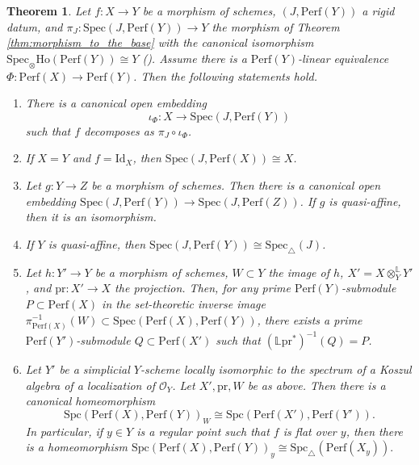 \documentclass[11pt]{amsart}
\theoremstyle{definition}
\theoremstyle{plain}
\newtheorem{thm}[defn]{Theorem}
\theoremstyle{remark}
\newcommand{\Ho}{\mathrm{Ho}}
\newcommand{\perf}{\mathrm{Perf}}
\newcommand{\Spec}{\mathrm{Spec}}
\newcommand{\tSpec}{\mathrm{Spec}_{\triangle}}
\newcommand{\mo}{\mathrm}
\newcommand{\sO}{\mathscr{O}}
\newcommand{\ld}{\mathbb{L}}
\newcommand{\dotimes}{\otimes^{\mathbb{L}}}
\newcommand{\Id}{\mathrm{Id}}
\newcommand{\oSpec}{\mathrm{Spec}_{\otimes}}
\newcommand{\Spc}{\mathrm{Spc}}
\newcommand{\tSpc}{\mathrm{Spc}_{\triangle}}
\numberwithin{equation}{section}
\begin{document}
\begin{thm}\label{thm:example_of_perfect_complexes}
Let \(f:X\to Y\) be a morphism of schemes, \((J,\perf(Y))\) a rigid datum, 
and \(\pi_J:\Spec(J,\perf(Y))\to Y\) the morphism of 
Theorem \ref{thm:morphism_to_the_base} with the canonical isomorphism 
\(\oSpec\Ho(\perf(Y))\cong Y\) (\cite{Ba}).  
Assume there is a \(\perf(Y)\)-linear equivalence 
\(\Phi:\perf(X)\to \perf(Y)\).  
Then the following statements hold.
\begin{enumerate}
  \item There is a canonical open embedding 
  \[\iota_{\Phi}:X\to \Spec(J,\perf(Y))\] 
  such that \(f\) decomposes as \(\pi_J\circ\iota_\Phi\).
  \item If \(X=Y\) and \(f=\Id_X\), then \(\Spec(J,\perf(X))\cong X\).
  \item Let \(g:Y\to Z\) be a morphism of schemes.  
  Then there is a canonical open embedding \(\Spec(J,\perf(Y))\to \Spec(J,\perf(Z))\).  
  If \(g\) is quasi-affine, then it is an isomorphism.
  \item If \(Y\) is quasi-affine, then \(\Spec(J,\perf(Y))\cong \tSpec(J)\).
  \item Let \(h:Y'\to Y\) be a morphism of schemes, \(W\subset Y\) the image of \(h\), \(X'=X\dotimes_Y Y'\), and \(\mo{pr}:X'\to X\) the projection.  
  Then, for any prime \(\perf(Y)\)-submodule \(P\subset \perf(X)\) in the set-theoretic inverse image \(\pi^{-1}_{\perf(X)}(W)\subset \Spec(\perf(X),\perf(Y))\), there exists a prime \(\perf(Y')\)-submodule \(Q\subset \perf(X')\) such that \((\ld \mo{pr}^*)^{-1}(Q)=P \).
  \item Let \(Y'\) be a simplicial \(Y\)-scheme locally isomorphic to the spectrum of a Koszul algebra of a localization of \(\sO_Y\).  
  Let \(X',\mo{pr},W\) be as above.  
  Then there is a canonical homeomorphism
  \[\Spc(\perf(X),\perf(Y))_{W}\cong \Spc(\perf(X'),\perf(Y')).\]  
  In particular, if \(y\in Y\) is a regular point such that \(f\) is flat over \(y\), then there is a homeomorphism \(\Spc(\perf(X),\perf(Y))_y\cong \tSpc(\perf(X_y)).\)
\end{enumerate}
\end{thm}
\end{document}
